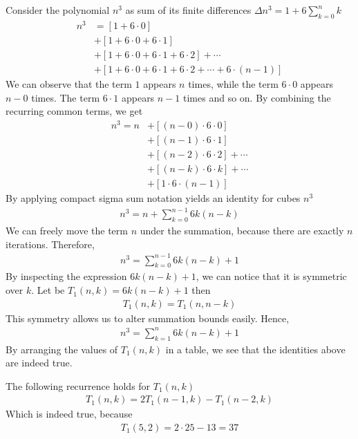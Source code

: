 Consider the polynomial $n^3$ as sum of its finite differences
$\Delta n^3 = 1 +  6 \sum_{k=0}^{n} k$
\begin{align*}
    n^3
    &= [1+6\cdot0] \\
    &+ [1+6\cdot0+6\cdot1] \\
    &+ [1+6\cdot0+6\cdot1+6\cdot2] + \cdots \\
    &+ [1+6\cdot0+6\cdot1+6\cdot2+\cdots+6\cdot(n-1)]
\end{align*}
We can observe that the term $1$ appears $n$ times, while the term $6\cdot0$ appears $n-0$ times.
The term $6\cdot1$ appears $n-1$ times and so on.
By combining the recurring common terms, we get
\begin{align*}
    n^3 = n
    &+ [(n-0) \cdot 6 \cdot 0] \\
    &+ [(n-1)\cdot6\cdot1] \\
    &+ [(n-2)\cdot6\cdot2] + \cdots \\
    &+ [(n-k)\cdot 6 \cdot k] + \cdots \\
    &+ [1\cdot6\cdot(n-1)]
\end{align*}
By applying compact sigma sum notation yields an identity for cubes $n^3$
\begin{align*}
    n^3 = n + \sum_{k=0}^{n-1} 6k(n-k)
\end{align*}
We can freely move the term $n$ under the summation, because there are exactly $n$ iterations.
Therefore,
\begin{align*}
    n^3 = \sum_{k=0}^{n-1} 6k(n-k) + 1
\end{align*}
By inspecting the expression $6k(n-k) + 1$, we can notice that it is symmetric over $k$.
Let be $T_{1} (n,k) = 6k(n-k) + 1$ then
\begin{align*}
    T_{1} (n,k) = T_{1} (n,n-k)
\end{align*}
This symmetry allows us to alter summation bounds easily.
Hence,
\begin{align*}
    n^3 = \sum_{k=1}^{n} 6k(n-k) + 1
\end{align*}
By arranging the values of $T_{1} (n,k)$ in a table, we see that the identities above are indeed true.

The following recurrence holds for $T_{1} (n,k)$
\begin{align*}
    T_{1} (n, k) = 2T_{1} (n-1, k) - T_{1} (n-2, k)
\end{align*}
Which is indeed true, because
\begin{align*}
    T_{1} (5, 2) = 2 \cdot 25 - 13 = 37
\end{align*}
